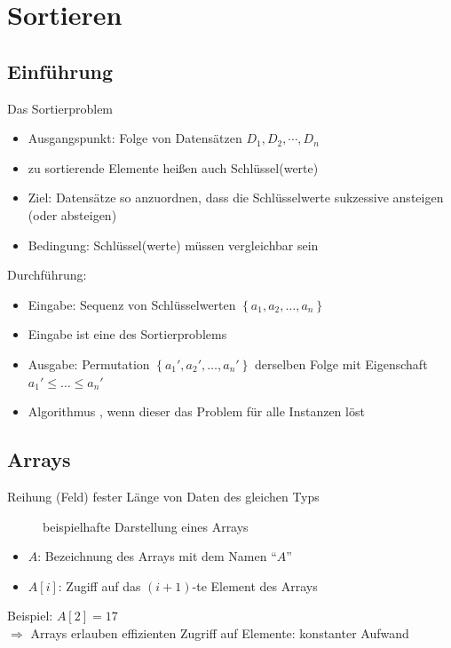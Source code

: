 \documentclass[
    12pt,
    a4paper,
    ngerman,
    color=3b,%
    marginpar=false,
    colorback=false,
    leqno,
]{tudaexercise}
\begin{document}
\section{Sortieren}\label{2}\label{Sortieren}
\subsection{Einführung}\label{2.1}\label{Einfuehrung Sortieren}
Das Sortierproblem\\
\begin{itemize}
    \item Ausgangspunkt: Folge von Datensätzen $D_1,D_2,\cdots,D_n$
          \begin{figure}[h]
              \centering
              \label{fig:folge_von_Datensätzen}
          \end{figure}
          \vspace*{-1em}
    \item zu sortierende Elemente heißen auch Schlüssel(werte)
    \item Ziel:  Datensätze so anzuordnen, dass die Schlüsselwerte sukzessive
          ansteigen (oder absteigen)
    \item Bedingung: Schlüssel(werte) müssen vergleichbar sein
\end{itemize}
Durchführung:\begin{itemize}
    \item Eingabe: Sequenz von Schlüsselwerten $\left\{a_1,a_2,\ldots,a_n\right\}$
    \item Eingabe ist eine  des Sortierproblems
    \item Ausgabe: Permutation $\left\{a_1',a_2',\ldots,a_n'\right\}$ derselben Folge mit Eigenschaft $a_1'\leq\ldots\leq a_n'$
    \item Algorithmus , wenn dieser das Problem für alle Instanzen löst
\end{itemize}
\clearpage
\subsection{Arrays}\label{2.2}\label{Arrays}
Reihung (Feld) fester Länge von Daten des gleichen Typs
\begin{figure}[h]
    \centering
    \caption{beispielhafte Darstellung eines Arrays}
    \label{fig:folge_von_Datensätzen}
\end{figure}
\begin{itemize}
    \item $A$: Bezeichnung des Arrays mit dem Namen "`$A$"'
    \item $A[i]$: Zugiff auf das $(i+1)$-te Element des Arrays
\end{itemize}
Beispiel: $A[2]=17$\\
$\Longrightarrow$ Arrays erlauben effizienten Zugriff auf Elemente: konstanter Aufwand
\end{document}
